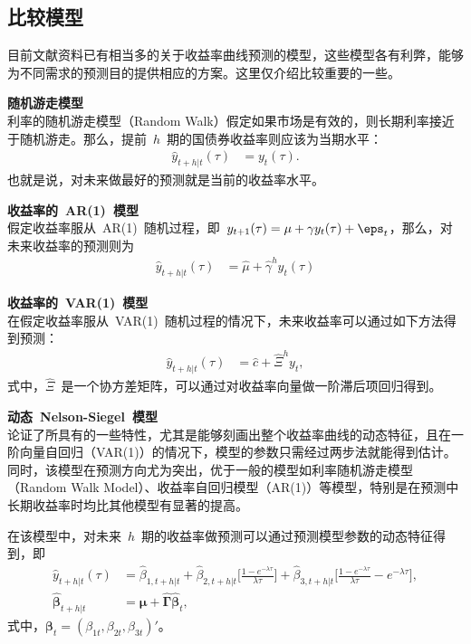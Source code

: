 \subsection{比较模型}
目前文献资料已有相当多的关于收益率曲线预测的模型，这些模型各有利弊，能够为不同需求的预测目的提供相应的方案。这里仅介绍比较重要的一些\tsm。
 \begin{compactenum}[(1)]
 \item {\bf 随机游走模型}\\
 利率的随机游走模型（Random Walk）假定如果市场是有效的，则长期利率接近于随机游走。那么，提前~$h$~期的国债券收益率则应该为当期水平：
     \begin{align}
       \hat{y}_{t+h|t}(\tau)
       &= y_{t}(\tau).
     \end{align}
也就是说，对未来做最好的预测就是当前的收益率水平。
 \item {\bf 收益率的~AR(1)~模型} \\
 假定收益率服从~AR(1)~随机过程，即~$y_{t+1}(\tau)=\mu+\gamma y_{t}(\tau)+\eps_t$，那么，对未来收益率的预测则为
     \begin{align}
        \hat{y}_{t+h|t}(\tau)
       &= \hat{\mu} + \hat{\gamma}^h y_{t}(\tau)
     \end{align}
 \item {\bf 收益率的~VAR(1)~模型}\\
  在假定收益率服从~VAR(1)~随机过程的情况下，未来收益率可以通过如下方法得到预测：
  \begin{align}
     \hat{y}_{t+h|t}(\tau)
       &= \hat{c} + \hat{\Xi}^h y_{t},
  \end{align}
 式中，$\hat{\Xi}$~是一个协方差矩阵，可以通过对收益率向量做一阶滞后项回归得到。
  \item{\bf 动态~Nelson-Siegel~模型}\\
     论证了\dns 所具有的一些特性，尤其是能够刻画出整个收益率曲线的动态特征，且在一阶向量自回归（VAR(1)）的情况下，模型的参数只需经过两步法就能得到估计。同时，该模型在预测方向尤为突出，优于一般的模型如利率随机游走模型（Random Walk Model）、收益率自回归模型（AR(1)）等模型，特别是\dns 在预测中长期收益率时均比其他模型有显著的提高。

     在该模型中，对未来~$h$~期的收益率做预测可以通过预测模型参数的动态特征得到，即
     \begin{align}
    \hat{y}_{t+h|t}(\tau) &= \hat{\beta}_{1,t+h|t}
        + \hat{\beta}_{2,t+h|t} \big[\frac{1-e^{-\lambda \tau}} {\lambda \tau} \big]
        + \hat{\beta}_{3,t+h|t}\big[\frac{1-e^{-\lambda \tau}} {\lambda \tau} - e^{-\lambda  \tau} \big], \\
    \mathbf{\hat{\beta}}_{t+h|t} &= \hat{\mathbf{\mu}} + \hat{\mathbf{\Gamma}}\mathbf{\hat{\beta}}_{t}, \nonumber
  \end{align}
  式中，$\mathbf{\beta}_t=(\beta_{1t},\beta_{2t},\beta_{3t})'$。
 \end{compactenum}

